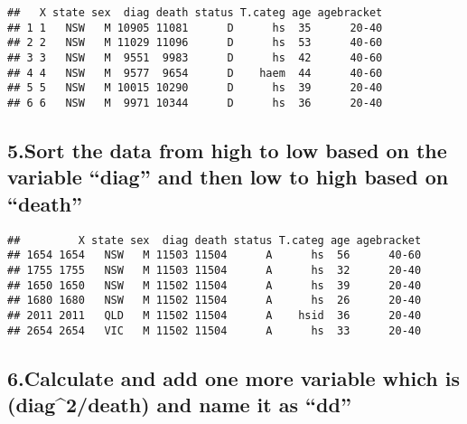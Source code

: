 \documentclass[
]{article}
\newenvironment{Shaded}{\begin{snugshade}}{\end{snugshade}}
\newcommand{\KeywordTok}[1]{\textcolor[rgb]{0.13,0.29,0.53}{\textbf{#1}}}
\newcommand{\NormalTok}[1]{#1}
\newcommand{\OperatorTok}[1]{\textcolor[rgb]{0.81,0.36,0.00}{\textbf{#1}}}
\begin{document}
\begin{verbatim}
##   X state sex  diag death status T.categ age agebracket
## 1 1   NSW   M 10905 11081      D      hs  35      20-40
## 2 2   NSW   M 11029 11096      D      hs  53      40-60
## 3 3   NSW   M  9551  9983      D      hs  42      40-60
## 4 4   NSW   M  9577  9654      D    haem  44      40-60
## 5 5   NSW   M 10015 10290      D      hs  39      20-40
## 6 6   NSW   M  9971 10344      D      hs  36      20-40
\end{verbatim}

\hypertarget{sort-the-data-from-high-to-low-based-on-the-variable-diag-and-then-low-to-high-based-on-death}{%
\subsection{5.Sort the data from high to low based on the variable
``diag'' and then low to high based on
``death''}\label{sort-the-data-from-high-to-low-based-on-the-variable-diag-and-then-low-to-high-based-on-death}}

\begin{Shaded}
\end{Shaded}

\begin{verbatim}
##         X state sex  diag death status T.categ age agebracket
## 1654 1654   NSW   M 11503 11504      A      hs  56      40-60
## 1755 1755   NSW   M 11503 11504      A      hs  32      20-40
## 1650 1650   NSW   M 11502 11504      A      hs  39      20-40
## 1680 1680   NSW   M 11502 11504      A      hs  26      20-40
## 2011 2011   QLD   M 11502 11504      A    hsid  36      20-40
## 2654 2654   VIC   M 11502 11504      A      hs  33      20-40
\end{verbatim}

\hypertarget{calculate-and-add-one-more-variable-which-is-diag2death-and-name-it-as-dd}{%
\subsection{6.Calculate and add one more variable which is
(diag\^{}2/death) and name it as
``dd''}\label{calculate-and-add-one-more-variable-which-is-diag2death-and-name-it-as-dd}}
\end{document}
